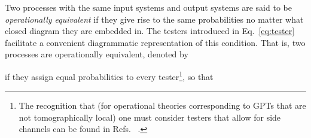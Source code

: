 \documentclass[onecolum,aps,groupedaddress,nofootinbib]{revtex4-2}
\begin{document}
Two processes with the same input systems and output systems are said to be {\em operationally equivalent} if they give rise to the same probabilities no matter what closed diagram they are embedded in.  The testers introduced in Eq.~\eqref{eq:tester} facilitate a convenient diagrammatic representation of this condition.
That is, two processes are operationally equivalent, denoted by
\beq
{}
\eeq
if they assign equal probabilities to every tester\footnote{The recognition that (for operational theories corresponding to GPTs that are not tomographically local) one must consider testers that allow for side channels can be found in Refs.~\cite{hardy2011reformulating,chiribella2014dilation,chiribella2016quantum} .}, so that
\beq
\forall \tau  \ \
\end{document}
